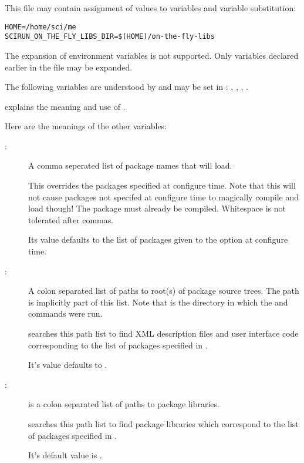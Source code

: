 This file may contain assignment of values to variables and variable
substitution:

\begin{verbatim}
HOME=/home/sci/me
SCIRUN_ON_THE_FLY_LIBS_DIR=$(HOME)/on-the-fly-libs
\end{verbatim}

The expansion of environment variables is not supported.  Only
variables declared earlier in the file may be expanded.

The following variables are understood by \sr{} and may be set in
: ,
, ,
.

 explains the meaning and use
of .

Here are the meanings of the other variables:

\begin{description}
  \item[\mbox{}: ]\mbox{} 
    
    A comma seperated list of package names that \sr{} will load.
    
    This overrides the packages specified at configure time.  Note
    that this will not cause packages not specifed at configure time
    to magically compile and load though!  The package must already be
    compiled.  Whitespace is not tolerated after commas.
    
    Its value defaults to the list of packages given to the
     option at configure time.
    
  \item[\mbox{}: ]\mbox{} 
    
    A colon separated list of paths to root(s) of package source
    trees.  The path  is implicitly part of
    this list.  Note that  is the directory in which
    the  and  commands were run.
   
    \sr{} searches this path list to find XML description files and
    user interface code corresponding to the list of packages
    specified in .
    
    It's value defaults to .

  \item[\mbox{}: ]\mbox{} 
    
     is a colon separated list of paths to
    package libraries.
    
    \sr{} searches this path list to find package libraries
    which correspond to the list of packages specified in
    .
    
    It's default value is .

\end{description}

